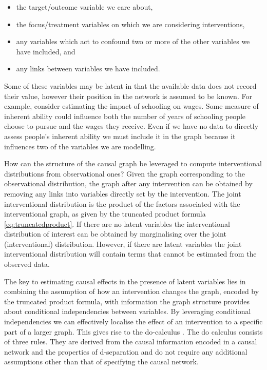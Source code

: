 \documentclass[11pt,a4paper,oneside]{book}
\theoremstyle{plain}
\theoremstyle{definition}
\begin{document}
\begin{itemize}
\item the target/outcome variable we care about,
\item the focus/treatment variables on which we are considering interventions,
\item any variables which act to confound two or more of the other variables we have included, and
\item any links between variables we have included. 
\end{itemize}

Some of these variables may be latent in that the available data does not record their value, however their position in the network is assumed to be known. For example, consider estimating the impact of schooling on wages. Some measure of inherent ability could influence both the number of years of schooling people choose to pursue and the wages they receive. Even if we have no data to directly assess people's inherent ability we must include it in the graph because it influences two of the variables we are modelling. 

How can the structure of the causal graph be leveraged to compute interventional distributions from observational ones? Given the graph corresponding to the observational distribution, the graph after any intervention can be obtained by removing any links into variables directly set by the intervention. The joint interventional distribution is the product of the factors associated with the interventional graph, as given by the truncated product formula \ref{eq:truncatedproduct}. If there are no latent variables the interventional distribution of interest can be obtained by marginalising over the joint (interventional) distribution. However, if there are latent variables the joint interventional distribution will contain terms that cannot be estimated from the observed data. 

The key to estimating causal effects in the presence of latent variables lies in combining the assumption of how an intervention changes the graph, encoded by the truncated product formula, with information the graph structure provides about conditional independencies between variables. 
By leveraging conditional independencies we can effectively localise the effect of an intervention to a specific part of a larger graph. This gives rise to the do-calculus \citep{Pearl2000}. The do calculus consists of three rules. They are derived from the causal information encoded in a causal network and the properties of d-separation and do not require any additional assumptions other than that of specifying the causal network.
\end{document}
